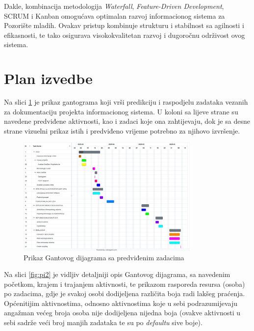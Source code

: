 Dakle, kombinacija metodologija \textit{Waterfall}, \textit{Feature-Driven Development}, SCRUM i Kanban omogućava optimalan razvoj informacionog sistema za Pozorište mladih. Ovakav pristup kombinuje strukturu i stabilnost sa agilnosti i efikasnosti, te tako osigurava visokokvalitetan razvoj i dugoročnu održivost ovog sistema.

\sloppy

\section{Plan izvedbe}
Na slici \ref{fig:pi1} je prikaz gantograma koji vrši predikciju i raspodjelu zadataka vezanih za dokumentaciju projekta informacionog sistema. U koloni sa lijeve strane su navedene predviđene aktivnosti, kao i zadaci koje ona zahtijevaju, dok je sa desne strane vizuelni prikaz istih i predviđeno vrijeme potrebno za njihovo izvršenje.

\begin{figure}[H]
    \centering
    \includegraphics[width=0.8\textwidth]{Slike/gantogram.png}
    \caption{Prikaz Gantovog dijagrama sa predviđenim zadacima}
    \label{fig:pi1}
\end{figure}

Na slici \ref{fig:pi2} je vidljiv detaljniji opis Gantovog dijagrama, sa navedenim početkom, krajem i trajanjem aktivnosti, te prikazom rasporeda resursa (osoba) po zadacima, gdje je svakoj osobi dodijeljena različita boja radi lakšeg praćenja. Općenitijim aktivnostima, odnosno aktivnostima koje u sebi podrazumijevaju angažman većeg broja osoba nije dodijeljena nijedna boja (ovakve aktivnosti u sebi sadrže veći broj manjih zadataka te su po \textit{defaultu} sive boje). 

